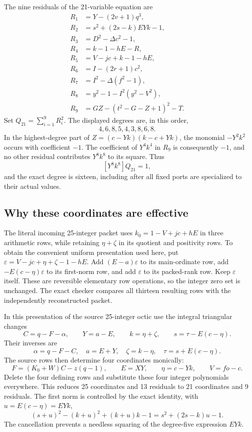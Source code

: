 The nine residuals of the 21-variable equation are
\begin{align*}
 R_1&=Y-(2v+1)q^3,\\
 R_2&=s^2+(2s-k)EYk-1,\\
 R_3&=D^2-\Delta c^2-1,\\
 R_4&=k-1-hE-R,\\
 R_5&=V-jc+k-1-hE,\\
 R_6&=I-(2r+1)c^2,\\
 R_7&=I^2-\Delta(f^2-1),\\
 R_8&=y^2-1-I^2(y^2-V^2),\\
 R_9&=GZ-(t^2-G-Z+1)^2-T.
\end{align*}
Set $Q_{21}=\sum_{i=1}^9R_i^2$. The displayed degrees are,
in this order,
\[
 4,6,8,5,4,3,8,6,8.
\]
In the highest-degree part of $Z=(c-Yk)(k-c+Yk)$, the monomial
$-Y^2k^2$ occurs with coefficient $-1$. The coefficient of $Y^4k^4$
in $R_9$ is consequently $-1$, and no other residual contributes
$Y^8k^8$ to its square. Thus
\[
 [Y^8k^8]Q_{21}=1,
\]
and the exact degree is sixteen, including after all fixed ports are
specialized to their actual values.

\subsection{Why these coordinates are effective}

The literal incoming 25-integer packet uses
$k_0=1-V+jc+hE$ in three arithmetic rows, while retaining
$\eta+\zeta$ in its quotient and positivity rows. To obtain the convenient
uniform presentation used here, put
$\varepsilon=V-jc+\eta+\zeta-1-hE$. Add $(E-a)\varepsilon$ to its main-ordinate row,
add $-E(c-\eta)\varepsilon$ to its first-norm row, and add $\varepsilon$ to its packed-rank
row. Keep $\varepsilon$ itself. These are reversible elementary row operations,
so the integer zero set is unchanged. The exact checker compares all
thirteen resulting rows with the independently reconstructed packet.

In this presentation of the source 25-integer octic use the integral triangular changes
\[
 C=q-F-\alpha,\qquad Y=a-E,\qquad k=\eta+\zeta,
 \qquad s=\tau-E(c-\eta).
\]
Their inverses are
\[
 \alpha=q-F-C,\quad a=E+Y,\quad\zeta=k-\eta,
 \quad\tau=s+E(c-\eta).
\]
The source rows then determine four coordinates monically:
\[
 F=(K_0+W)C-z(q-1),\qquad E=XY,\qquad
 \eta=c-Yk,\qquad V=fo-c.
\]
Delete the four defining rows and substitute these four integer
polynomials everywhere. This reduces 25 coordinates and 13 residuals
to 21 coordinates and 9 residuals. The first norm is controlled by
the exact identity, with $u=E(c-\eta)=EYk$,
\[
 (s+u)^2-(k+u)^2+(k+u)k-1
   =s^2+(2s-k)u-1.
\]
The cancellation prevents a needless squaring of the degree-five
expression $EYk$.

